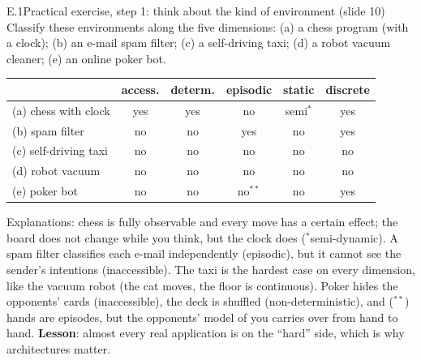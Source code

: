 \begin{nbexercise}{E.1}{Practical exercise, step 1: think about the kind of environment (slide 10)}
Classify these environments along the five dimensions:
(a) a chess program (with a clock); (b) an e-mail spam filter; (c) a self-driving taxi;
(d) a robot vacuum cleaner; (e) an online poker bot.
\end{nbexercise}
\begin{nbsolution}
\small
\begin{tabular}{@{}lccccc@{}}
\toprule
 & \textbf{access.} & \textbf{determ.} & \textbf{episodic} & \textbf{static} & \textbf{discrete} \\
\midrule
(a) chess with clock & yes & yes & no & semi$^\ast$ & yes \\
(b) spam filter & no & no & yes & no & yes \\
(c) self-driving taxi & no & no & no & no & no \\
(d) robot vacuum & no & no & no & no & no \\
(e) poker bot & no & no & no$^{\ast\ast}$ & no & yes \\
\bottomrule
\end{tabular}

\normalsize
Explanations: chess is fully observable and every move has a certain effect; the board
does not change while you think, but the clock does ($^\ast$semi-dynamic). A spam filter
classifies each e-mail independently (episodic), but it cannot see the sender's intentions
(inaccessible). The taxi is the hardest case on every dimension, like the vacuum robot (the
cat moves, the floor is continuous). Poker hides the opponents' cards (inaccessible), the
deck is shuffled (non-deterministic), and ($^{\ast\ast}$) hands are episodes, but the
opponents' model of you carries over from hand to hand. \textbf{Lesson}: almost every
real application is on the ``hard'' side, which is why architectures matter.
\end{nbsolution}
